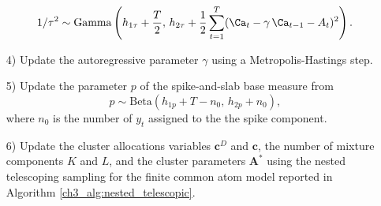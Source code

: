 \begin{enumerate}
\begin{equation*}
	1/\tau^2 \sim \mathrm{Gamma}\left( h_{1\tau} + \frac{T}{2},\, h_{2\tau} + \frac{1}{2} \sum_{t=1}^T (\Ca_t - \gamma \, \Ca_{t-1} - A_t)^2 \right).
	\end{equation*}
	\item[4)] Update the autoregressive parameter $\gamma$ using a Metropolis-Hastings step.
	\item[5)] Update the parameter $p$ of the spike-and-slab base measure from
	\begin{equation*}
	p \sim \mathrm{Beta}(h_{1p} + T - n_0,\, h_{2p} + n_0), 
	\end{equation*}
	where $n_0$ is the number of $y_t$ assigned to the the spike component.
	\item[6)] Update the cluster allocations variables $\bm{c}^D$ and $\bm{c}$, the number of mixture components $K$ and $L$, and the cluster parameters $\bm{A}^*$ using the nested telescoping sampling for the finite common atom model reported in Algorithm \ref{ch3_alg:nested_telescopic}.
\end{enumerate}

